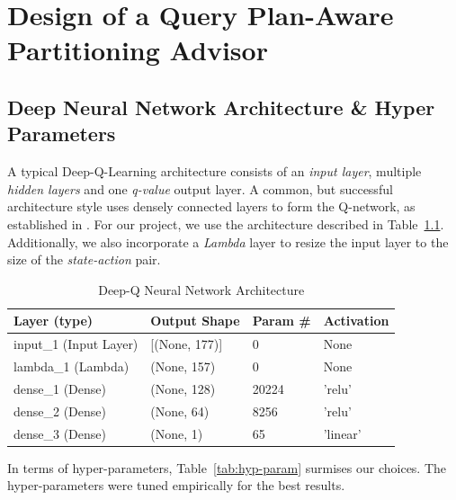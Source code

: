 \chapter{Design of a Query Plan-Aware Partitioning Advisor}
\label{Methods}

\section{Deep Neural Network Architecture \& Hyper Parameters}
A typical Deep-Q-Learning architecture consists of an \textit{input layer}, multiple \textit{hidden layers} and one \textit{q-value} output layer. A common, but successful architecture style uses densely connected layers to form the Q-network, as established in \cite{DBLP:journals/corr/MnihKSGAWR13}. For our project, we use the architecture described in Table~\ref{tab:neural-network-architecture}. Additionally, we also incorporate a \textit{Lambda} layer to resize the input layer to the size of the \textit{state-action} pair. 

\begin{table}[ht]
  \centering
    \begin{tabular}{|l|l|l|l|}
\hline
\rowcolor[HTML]{DAE8FC} 
\textbf{Layer (type)}  & \textbf{Output Shape} & \textbf{Param \#} & \textbf{Activation} \\ \hline
input\_1 (Input Layer) & {[}(None, 177){]}     & 0                 & None                \\ \hline
lambda\_1 (Lambda)     & (None, 157)           & 0                 & None                \\ \hline
dense\_1 (Dense)       & (None, 128)           & 20224             & 'relu'              \\ \hline
dense\_2 (Dense)       & (None, 64)            & 8256              & 'relu'              \\ \hline
dense\_3 (Dense)       & (None, 1)             & 65                & 'linear'            \\ \hline
\end{tabular}
    \caption{Deep-Q Neural Network Architecture}
    \label{tab:neural-network-architecture}
\end{table}

In terms of hyper-parameters, Table~\ref{tab:hyp-param} surmises our choices. The hyper-parameters were tuned empirically for the best results.

